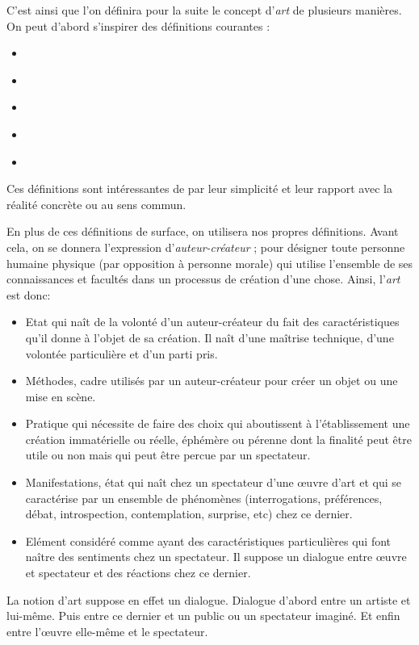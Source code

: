 \documentclass[12pt]{article} %
\begin{document}
C'est ainsi que l'on définira pour la suite le concept d'\textit{art} de plusieurs manières. On peut d'abord s'inspirer des définitions courantes :
\begin{itemize}
    \item {} \cite{WiktionnaireFr-art}
    \item {} \cite{WiktionnaireFr-art}
    \item {} \cite{LarousseOnline-art}
    \item {} \cite{LarousseOnline-art}
    \item {} \cite{LarousseOnline-art}
\end{itemize}
Ces définitions sont intéressantes de par leur simplicité et leur rapport avec la réalité concrète ou au sens commun.

En plus de ces définitions de surface, on utilisera nos propres définitions. Avant cela, on se donnera l'expression d'\textit{auteur-créateur} ; pour désigner toute personne humaine physique (par opposition à personne morale) qui utilise l'ensemble de ses connaissances et facultés dans un processus de création d'une chose. Ainsi, l'\textit{art} est donc:
\begin{itemize}
    \item Etat qui naît de la volonté d'un auteur-créateur du fait des caractéristiques qu'il donne à l'objet de sa création. Il naît d'une maîtrise technique, d'une volontée particulière et d'un parti pris.
    \item Méthodes, cadre utilisés par un auteur-créateur pour créer un objet ou une mise en scène.\label{art_definition_cadre}
    \item Pratique qui nécessite de faire des choix qui aboutissent à l'établissement une création immatérielle ou réelle, éphémère ou pérenne dont la finalité peut être utile ou non mais qui peut être percue par un spectateur.
    \item Manifestations, état qui naît chez un spectateur d'une œuvre d'art et qui se caractérise par un ensemble de phénomènes (interrogations, préférences, débat, introspection, contemplation, surprise, etc) chez ce dernier.
    \item Elément considéré comme ayant des caractéristiques particulières qui font naître des sentiments chez un spectateur. Il suppose un dialogue entre œuvre et spectateur et des réactions chez ce dernier.
\end{itemize}
La notion d'art suppose en effet un dialogue. Dialogue d'abord entre un artiste et lui-même. Puis entre ce dernier et un public ou un spectateur imaginé. Et enfin entre l'œuvre elle-même et le spectateur. 
\end{document}
